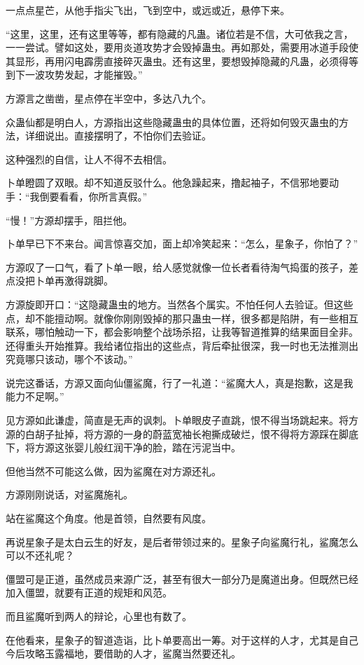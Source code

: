 \begin{this_body}
一点点星芒，从他手指尖飞出，飞到空中，或远或近，悬停下来。

“这里，这里，还有这里等等，都有隐藏的凡蛊。诸位若是不信，大可依我之言，一一尝试。譬如这处，要用炎道攻势才会毁掉蛊虫。再如那处，需要用冰道手段使其显形，再用闪电霹雳直接碎灭蛊虫。还有这里，要想毁掉隐藏的凡蛊，必须得等到下一波攻势发起，才能摧毁。”

方源言之凿凿，星点停在半空中，多达八九个。

众蛊仙都是明白人，方源指出这些隐藏蛊虫的具体位置，还将如何毁灭蛊虫的方法，详细说出。直接摆明了，不怕你们去验证。

这种强烈的自信，让人不得不去相信。

卜单瞪圆了双眼。却不知道反驳什么。他急躁起来，撸起袖子，不信邪地要动手：“我倒要看看，你所言真假。”

“慢！”方源却摆手，阻拦他。

卜单早已下不来台。闻言惊喜交加，面上却冷笑起来：“怎么，星象子，你怕了？”

方源叹了一口气，看了卜单一眼，给人感觉就像一位长者看待淘气捣蛋的孩子，差点没把卜单再激得跳脚。

方源旋即开口：“这隐藏蛊虫的地方。当然各个属实。不怕任何人去验证。但这些点，却不能擅动啊。就像你刚刚毁掉的那只蛊虫一样，很多都是陷阱，有一些相互联系，哪怕触动一下，都会影响整个战场杀招，让我等智道推算的结果面目全非。还得重头开始推算。我给诸位指出的这些点，背后牵扯很深，我一时也无法推测出究竟哪只该动，哪个不该动。”

说完这番话，方源又面向仙僵鲨魔，行了一礼道：“鲨魔大人，真是抱歉，这是我能力不足啊。”

见方源如此谦虚，简直是无声的讽刺。卜单眼皮子直跳，恨不得当场跳起来。将方源的白胡子扯掉，将方源的一身的蔚蓝宽袖长袍撕成破烂，恨不得将方源踩在脚底下，将方源这张婴儿般红润干净的脸，踏在污泥当中。

但他当然不可能这么做，因为鲨魔在对方源还礼。

方源刚刚说话，对鲨魔施礼。

站在鲨魔这个角度。他是首领，自然要有风度。

再说星象子是太白云生的好友，是后者带领过来的。星象子向鲨魔行礼，鲨魔怎么可以不还礼呢？

僵盟可是正道，虽然成员来源广泛，甚至有很大一部分乃是魔道出身。但既然已经加入僵盟，就要有正道的规矩和风范。

而且鲨魔听到两人的辩论，心里也有数了。

在他看来，星象子的智道造诣，比卜单要高出一筹。对于这样的人才，尤其是自己今后攻略玉露福地，要借助的人才，鲨魔当然要还礼。


\end{this_body}
